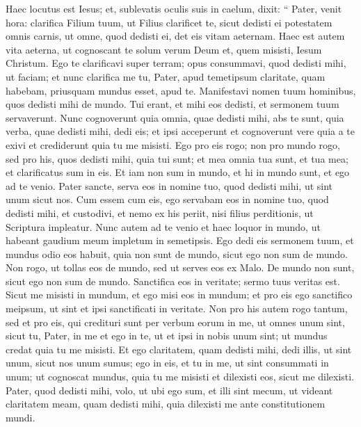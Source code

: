 \begin{biblechapter}
\begin{biblechapter}
\begin{biblechapter}
\begin{biblechapter}
\begin{biblechapter}
\begin{biblechapter}
\begin{biblechapter}
\begin{biblechapter}
\begin{biblechapter}
\begin{biblechapter}
\begin{biblechapter}
\begin{biblechapter}
\begin{biblechapter}
\begin{biblechapter}
\begin{biblechapter}
\begin{biblechapter}
\begin{biblechapter}
\verse Haec locutus est Iesus; et, sublevatis oculis suis in caelum, dixit: “ Pater, venit hora: clarifica Filium tuum, ut Filius clarificet te, 
\verse sicut dedisti ei potestatem omnis carnis, ut omne, quod dedisti ei, det eis vitam aeternam. 
\verse Haec est autem vita aeterna, ut cognoscant te solum verum Deum et, quem misisti, Iesum Christum. 
\verse Ego te clarificavi super terram; opus consummavi, quod dedisti mihi, ut faciam; 
\verse et nunc clarifica me tu, Pater, apud temetipsum claritate, quam habebam, priusquam mundus esset, apud te.
 \verse Manifestavi nomen tuum hominibus, quos dedisti mihi de mundo. Tui erant, et mihi eos dedisti, et sermonem tuum servaverunt. 
\verse Nunc cognoverunt quia omnia, quae dedisti mihi, abs te sunt, 
\verse quia verba, quae dedisti mihi, dedi eis; et ipsi acceperunt et cognoverunt vere quia a te exivi et crediderunt quia tu me misisti. 
\verse Ego pro eis rogo; non pro mundo rogo, sed pro his, quos dedisti mihi, quia tui sunt; 
\verse et mea omnia tua sunt, et tua mea; et clarificatus sum in eis. 
\verse Et iam non sum in mundo, et hi in mundo sunt, et ego ad te venio.
 Pater sancte, serva eos in nomine tuo, quod dedisti mihi, ut sint unum sicut nos. 
\verse Cum essem cum eis, ego servabam eos in nomine tuo, quod dedisti mihi, et custodivi, et nemo ex his periit, nisi filius perditionis, ut Scriptura impleatur. 
\verse Nunc autem ad te venio et haec loquor in mundo, ut habeant gaudium meum impletum in semetipsis. 
\verse Ego dedi eis sermonem tuum, et mundus odio eos habuit, quia non sunt de mundo, sicut ego non sum de mundo.
 \verse Non rogo, ut tollas eos de mundo, sed ut serves eos ex Malo. 
\verse De mundo non sunt, sicut ego non sum de mundo. 
\verse Sanctifica eos in veritate; sermo tuus veritas est. 
\verse Sicut me misisti in mundum, et ego misi eos in mundum; 
 \verse et pro eis ego sanctifico meipsum, ut sint et ipsi sanctificati in veritate.
 \verse Non pro his autem rogo tantum, sed et pro eis, qui credituri sunt per verbum eorum in me, 
\verse ut omnes unum sint, sicut tu, Pater, in me et ego in te, ut et ipsi in nobis unum sint; ut mundus credat quia tu me misisti. 
\verse Et ego claritatem, quam dedisti mihi, dedi illis, ut sint unum, sicut nos unum sumus; 
\verse ego in eis, et tu in me, ut sint consummati in unum; ut cognoscat mundus, quia tu me misisti et dilexisti eos, sicut me dilexisti.
 \verse Pater, quod dedisti mihi, volo, ut ubi ego sum, et illi sint mecum, ut videant claritatem meam, quam dedisti mihi, quia dilexisti me ante constitutionem mundi.

\end{biblechapter}
\end{biblechapter}
\end{biblechapter}
\end{biblechapter}
\end{biblechapter}
\end{biblechapter}
\end{biblechapter}
\end{biblechapter}
\end{biblechapter}
\end{biblechapter}
\end{biblechapter}
\end{biblechapter}
\end{biblechapter}
\end{biblechapter}
\end{biblechapter}
\end{biblechapter}
\end{biblechapter}
